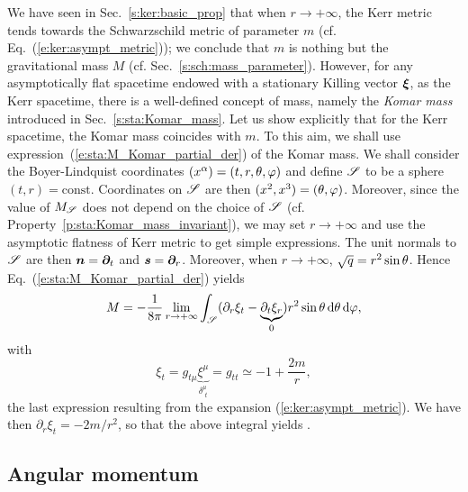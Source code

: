 We have seen in Sec.~\ref{s:ker:basic_prop} that when
$r\rightarrow +\infty$, the Kerr metric tends towards the Schwarzschild
metric of parameter $m$ (cf. Eq.~(\ref{e:ker:asympt_metric}));
we conclude that $m$ is nothing but the gravitational mass $M$ (cf.
Sec.~\ref{s:sch:mass_parameter}).
However, for any asymptotically flat spacetime endowed with
a stationary Killing vector $\bm{\xi}$, as the Kerr spacetime,
there is a well-defined concept of mass, namely the \emph{Komar mass}
introduced in Sec.~\ref{s:sta:Komar_mass}.
Let us show explicitly that for the Kerr spacetime, the Komar mass coincides with $m$.
To this aim, we shall use expression~(\ref{e:sta:M_Komar_partial_der})
of the Komar mass. We shall consider the Boyer-Lindquist coordinates
$(x^\alpha) = (t,r,\theta,\varphi)$ and define $\mathscr{S}$ to be a sphere
$(t,r)=\mathrm{const}$. Coordinates on $\mathscr{S}$ are then
$(x^2,x^3)=(\theta,\varphi)$. Moreover, since the value of $M_{\mathscr{S}}$ does not depend on
the choice of $\mathscr{S}$ (cf. Property~\ref{p:sta:Komar_mass_invariant}),
we may set $r\rightarrow +\infty$ and use the
asymptotic flatness of Kerr metric to get simple expressions. The unit normals
to $\mathscr{S}$ are then $\bm{n} = \bm{\partial}_t$ and $\bm{s} = \bm{\partial}_r$. Moreover, when
$r\rightarrow +\infty$, $\sqrt{q} = r^2\sin\theta$. Hence Eq.~(\ref{e:sta:M_Komar_partial_der})
yields
\[
    M = -\frac{1}{8\pi} \lim_{r\rightarrow +\infty}
        \int_{\mathscr{S}}
        (\partial_r \xi_t - \underbrace{\partial_t \xi_r}_{0} )
        r^2\sin\theta \, \mathrm{d}\theta\, \mathrm{d}\varphi ,
\]
with
\[
    \xi_t = g_{t\mu} \underbrace{\xi^\mu}_{\delta^\mu_{\ \, t}}
        = g_{tt} \simeq - 1 + \frac{2m}{r} ,
\]
the last expression resulting from the expansion (\ref{e:ker:asympt_metric}).
We have then $\partial_r \xi_t = -2m/r^2$, so that the above integral yields
\be \label{e:ker:M_m}
     .
\ee


\subsection{Angular momentum} \label{s:ker:Komar_J}


